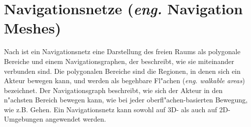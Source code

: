 \section{Navigationsnetze (\textit{eng.} Navigation Meshes)}
%
Nach \cite{Mesh:16} ist ein Navigationsnetz eine Darstellung des freien Raums als polygonale Bereiche und einem Navigationsgraphen, der beschreibt, wie sie miteinander verbunden sind. Die polygonalen Bereiche sind die Regionen, in denen sich ein Akteur bewegen kann, und werden als begehbare Fl"achen (\textit{eng. walkable areas}) bezeichnet. Der Navigationsgraph beschreibt, wie sich der Akteur in den n"achsten Bereich bewegen kann, wie bei jeder oberfl"achen-basierten Bewegung, wie z.B. Gehen. Ein Navigationsnetz kann sowohl auf 3D- als auch auf 2D-Umgebungen angewendet werden.

